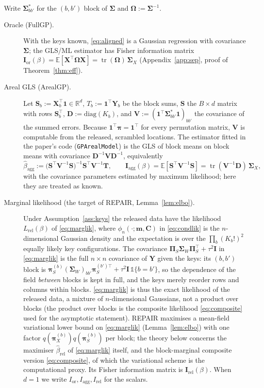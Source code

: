 \documentclass[11pt]{article}
\theoremstyle{definition}
\newcommand{\bX}{\mathbf{X}}
\newcommand{\bY}{\mathbf{Y}}
\newcommand{\bS}{\mathbf{S}}
\newcommand{\bT}{\mathbf{T}}
\newcommand{\bV}{\mathbf{V}}
\newcommand{\bD}{\mathbf{D}}
\newcommand{\bI}{\mathbf{I}}
\newcommand{\bone}{\mathbf{1}}
\newcommand{\bSig}{\boldsymbol{\Sigma}}
\newcommand{\bOm}{\boldsymbol{\Omega}}
\newcommand{\bpi}{\boldsymbol{\pi}}
\newcommand{\bPi}{\boldsymbol{\Pi}}
\newcommand{\E}{\mathbb{E}}
\newcommand{\tr}{\operatorname{tr}}
\newcommand{\rel}{\mathrm{rel}}
\newcommand{\agg}{\mathrm{agg}}
\newcommand{\orc}{\mathrm{or}}
\begin{document}
Write $\bSig^\ast_{bb'}$ for the $(b,b')$ block of $\bSig$ and $\bOm:=\bSig^{-1}$.
\begin{description}
\item[Oracle (FullGP).] With the keys known, \eqref{eq:aligned} is a Gaussian regression with covariance $\bSig$; the GLS/ML estimator has Fisher information matrix $\mathbf I_\orc(\beta)=\E[\bX^\top\bOm\bX]=\tr(\bOm)\,\bSig_X$ (Appendix~\ref{app:sep}, proof of Theorem~\ref{thm:eff}).
\item[Areal GLS (ArealGP).] Let $\bS_b:=\bX_b^\top\bone\in\mathbb R^d$, $T_b:=\bone^\top\bY_b$ be the block sums, $\mathbf S$ the $B\times d$ matrix with rows $\bS_b^\top$, $\bD:=\mathrm{diag}(K_b)$, and $\bV:=(\bone^\top\bSig^\ast_{bb'}\bone)_{bb'}$ the covariance of the summed errors. Because $\bone^\top\bpi=\bone^\top$ for every permutation matrix, $\bV$ is computable from the released, scrambled locations. The estimator fitted in the paper's code (\texttt{GPArealModel}) is the GLS of block means on block means with covariance $\bD^{-1}\bV\bD^{-1}$, equivalently
\begin{equation}\label{eq:agg}
\hat\beta_\agg:=\big(\mathbf S^\top\bV^{-1}\mathbf S\big)^{-1}\mathbf S^\top\bV^{-1}\bT,\qquad \mathbf I_\agg(\beta)=\E[\mathbf S^\top\bV^{-1}\mathbf S]=\tr(\bV^{-1}\bD)\,\bSig_X,
\end{equation}
with the covariance parameters estimated by maximum likelihood; here they are treated as known.
\item[Marginal likelihood (the target of REPAIR, Lemma~\ref{lem:elbo}).] Under Assumption~\ref{ass:keys} the released data have the likelihood $L_\rel(\beta)$ of \eqref{eq:marglik}, where $\phi_n(\cdot;\bm m,\mathbf C)$ in \eqref{eq:condlik} is the $n$-dimensional Gaussian density and the expectation is over the $\prod_b(K_b!)^2$ equally likely key configurations. The covariance $\bPi_S\bSig_W\bPi_S^\top+\tau^2\bI$ in \eqref{eq:marglik} is the full $n\times n$ covariance of $\bY$ given the keys: its $(b,b')$ block is $\bpi_S^{(b)}(\bSig_W)_{bb'}\bpi_S^{(b')\top}+\tau^2\bI\,\mathbb 1\{b=b'\}$, so the dependence of the field \emph{between} blocks is kept in full, and the keys merely reorder rows and columns within blocks. \eqref{eq:marglik} is thus the exact likelihood of the released data, a mixture of $n$-dimensional Gaussians, not a product over blocks (the product over blocks is the composite likelihood \eqref{eq:composite} used for the asymptotic statement). REPAIR maximises a mean-field variational lower bound on \eqref{eq:marglik} (Lemma~\ref{lem:elbo}) with one factor $q(\bpi_X^{(b)})q(\bpi_S^{(b)})$ per block; the theory below concerns the maximiser $\hat\beta_\rel$ of \eqref{eq:marglik} itself, and the block-marginal composite version \eqref{eq:composite}, of which the variational scheme is the computational proxy. Its Fisher information matrix is $\mathbf I_\rel(\beta)$. When $d=1$ we write $I_\orc,I_\agg,I_\rel$ for the scalars.
\end{description}
\end{document}
